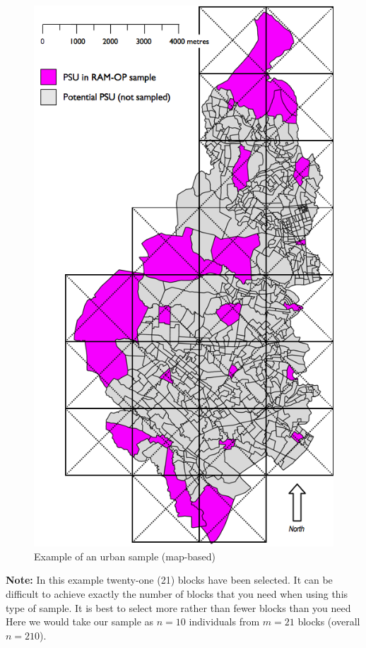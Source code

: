 \documentclass[12pt,a4paper]{book}
\theoremstyle{definition}
\theoremstyle{definition}
\theoremstyle{definition}
\theoremstyle{remark}
\begin{document}
\begin{figure}[H]

{\centering \includegraphics[width=6.97in]{figures/mapSample5} 

}

\caption{Example of an urban sample (map-based)}\label{fig:sample9}
\end{figure}

\textbf{Note:} In this example twenty-one (21) blocks have been
selected. It can be difficult to achieve exactly the number of blocks
that you need when using this type of sample. It is best to select more
rather than fewer blocks than you need Here we would take our sample as
\(n = 10\) individuals from \(m = 21\) blocks (overall \(n = 210\)).
\end{document}
